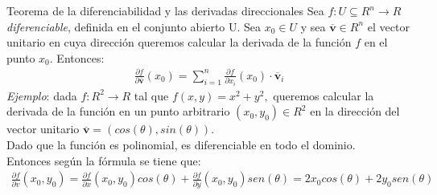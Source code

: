\documentclass[a4paper, twoside]{article}
\numberwithin{equation}{section}
\numberwithin{figure}{section}
\numberwithin{table}{section}
\newcommand{\vect}[1]{\overline{\textbf{#1}}}
\begin{document}
\begin{teorema*}{Teorema de la diferenciabilidad y las derivadas direccionales}
	Sea $f:U\subseteq R^n \rightarrow R$ \textit{\emph{diferenciable}}, definida en el conjunto abierto U. Sea $x_0\in U$ y sea $\vect{v}\in R^n$ el vector unitario en cuya dirección queremos calcular la derivada de la función $f$ en el punto $x_0.$ Entonces:
	\begin{align}
		\frac{\partial f}{\partial\vect{v}}(x_{0})=\sum_{i=1}^{n}\frac{\partial f}{\partial x_{i}}(x_0)\cdot\vect{v}_{i}
	\end{align}
	\textit{Ejemplo}: dada $f:R^2 \rightarrow R$ tal que $f(x,y)=x^2+y^2,$ queremos calcular la derivada de la función en un punto arbitrario $(x_{0},y_{0})\in R^2$ en la dirección del vector unitario $\vect{v}=(cos(\theta),sin(\theta))$.\\

	Dado que la función es polinomial, es diferenciable en todo el dominio.\\

	Entonces según la fórmula se tiene que:\\
	\begin{align}
		\frac{\partial f}{\partial v}(x_0,y_0)=\frac{\partial f}{\partial x}(x_0,y_0)cos(\theta)+\frac{\partial f}{\partial y}(x_0,y_0)sen(\theta)=2x_0cos(\theta)+2y_0sen(\theta)
	\end{align}
\end{teorema*}
\end{document}
